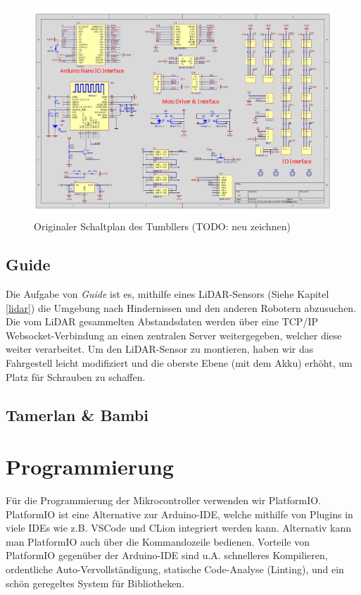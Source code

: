 \documentclass[12pt]{article}
\begin{document}
	\begin{figure}
		\includegraphics[width=\textwidth, center]{img/elegoo_tumbller_original_circuit.pdf}
		\caption{Originaler Schaltplan des Tumbllers (TODO: neu zeichnen)}
		\label{fig:elegoo_tumbller_original_circuit}
	\end{figure}

	\subsection{Guide}
	Die Aufgabe von \textit{Guide} ist es,
	mithilfe eines LiDAR-Sensors (Siehe Kapitel \ref{lidar}) die Umgebung nach Hindernissen
	und den anderen Robotern abzusuchen.
	Die vom LiDAR gesammelten Abstandsdaten werden über eine TCP/IP Websocket-Verbindung
	an einen zentralen Server weitergegeben,
	welcher diese weiter verarbeitet.
	Um den LiDAR-Sensor zu montieren,
	haben wir das Fahrgestell leicht modifiziert
	und die oberste Ebene (mit dem Akku) erhöht,
	um Platz für Schrauben zu schaffen.
	\subsection{Tamerlan \& Bambi}
	\section{Programmierung}
	Für die Programmierung der Mikrocontroller verwenden wir PlatformIO.
	PlatformIO ist eine Alternative zur Arduino-IDE,
	welche mithilfe von Plugins in viele IDEs wie z.B. VSCode und CLion integriert werden kann.
	Alternativ kann man PlatformIO auch über die Kommandozeile bedienen.
	Vorteile von PlatformIO gegenüber der Arduino-IDE sind u.A. schnelleres Kompilieren,
	ordentliche Auto-Vervollständigung,
	statische Code-Analyse (Linting),
	und ein schön geregeltes System für Bibliotheken.
\end{document}

